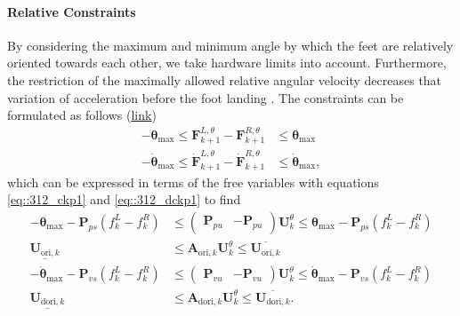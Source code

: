 \paragraph{Relative Constraints}
By considering the maximum and minimum angle by which the feet are relatively oriented towards each other, we take hardware limits into account. Furthermore, the restriction of the maximally allowed relative angular velocity decreases that variation of acceleration before the foot landing \cite{naveau2016reactive}. The constraints can be formulated as follows (\href{https://github.com/mhubii/nmpc_pattern_generator/blob/dc1f5a9366cbbbf76f1b02cada642f6ac9a04c89/libs/pattern_generator/src/base_generator.cpp#L1244}{\underline{link}})
\begin{align}
	-\bm{\theta}_\text{max}\leq\bm{F}_{k+1}^{L,\theta} - \bm{F}_{k+1}^{R,\theta} &\leq \bm{\theta}_\text{max} \\
	-\dot{\bm{\theta}}_\text{max}\leq\dot{\bm{F}}_{k+1}^{L,\theta} - \dot{\bm{F}}_{k+1}^{R,\theta} &\leq \dot{\bm{\theta}}_\text{max},
\end{align}
which can be expressed in terms of the free variables with equations \ref{eq::312_ckp1} and \ref{eq::312_dckp1} to find
\begin{align}
	-\bm{\theta}_\text{max}-\bm{P}_{ps}(f_k^L-f_k^R)&\leq \begin{pmatrix}
	\bm{P}_{pu} & -\bm{P}_{pu}
	\end{pmatrix}\bm{U}_k^\theta \leq \bm{\theta}_\text{max}-\bm{P}_{ps}(f_k^L-f_k^R) \\
	\underline{\bm{U}_{\text{ori},k}}&\leq \bm{A}_{\text{ori},k}\bm{U}_k^\theta \leq \overline{\bm{U}_{\text{ori},k}}\\
		-\dot{\bm{\theta}}_\text{max}-\bm{P}_{vs}(f_k^L-f_k^R)&\leq \begin{pmatrix}
	\bm{P}_{vu} & -\bm{P}_{vu}
	\end{pmatrix}\bm{U}_k^\theta \leq \dot{\bm{\theta}}_\text{max}-\bm{P}_{vs}(f_k^L-f_k^R)\\
	\underline{\bm{U}_{\text{dori},k}}&\leq \bm{A}_{\text{dori},k}\bm{U}_k^\theta \leq \overline{\bm{U}_{\text{dori},k}}.
\end{align}
